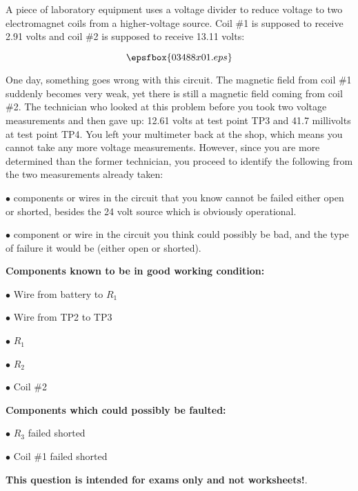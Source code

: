 

A piece of laboratory equipment uses a voltage divider to reduce voltage to two electromagnet coils from a higher-voltage source.  Coil \#1 is supposed to receive 2.91 volts and coil \#2 is supposed to receive 13.11 volts:

$$\epsfbox{03488x01.eps}$$

One day, something goes wrong with this circuit.  The magnetic field from coil \#1 suddenly becomes very weak, yet there is still a magnetic field coming from coil \#2.  The technician who looked at this problem before you took two voltage measurements and then gave up: 12.61 volts at test point TP3 and 41.7 millivolts at test point TP4.  You left your multimeter back at the shop, which means you cannot take any more voltage measurements.  However, since you are more determined than the former technician, you proceed to identify the following from the two measurements already taken:

\vskip 10pt

\medskip
\item{$\bullet$}  components or wires in the circuit that you know cannot be failed either open or shorted, besides the 24 volt source which is obviously operational.
\vskip 40pt
\item{$\bullet$}  component or wire in the circuit you think could possibly be bad, and the type of failure it would be (either open or shorted).
\medskip







\goodbreak
\noindent
{\bf Components known to be in good working condition:}

\medskip
\item{$\bullet$} Wire from battery to $R_1$
\item{$\bullet$} Wire from TP2 to TP3
\item{$\bullet$} $R_1$
\item{$\bullet$} $R_2$
\item{$\bullet$} Coil \#2
\medskip

\vskip 10pt

\goodbreak
\noindent
{\bf Components which could possibly be faulted:}

\medskip
\item{$\bullet$} $R_3$ failed shorted
\item{$\bullet$} Coil \#1 failed shorted
\medskip







{\bf This question is intended for exams only and not worksheets!}.



